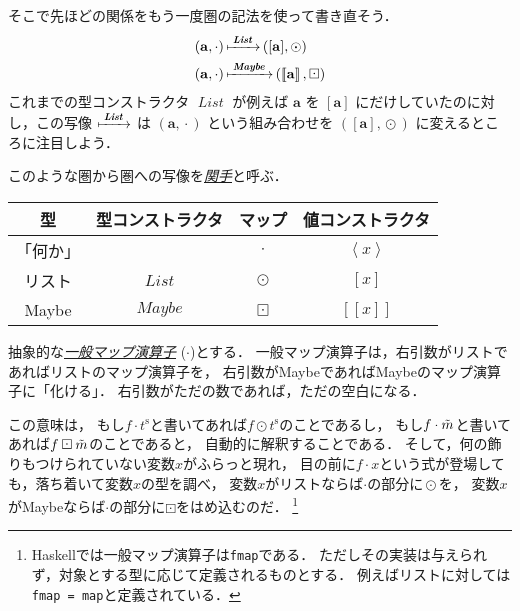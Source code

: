 \documentclass[a4paper,draft]{jsbook}
\def\[{\left[\!\left[}
\def\]{\right]\!\right]}
\newcommand{\programminglanguage}[1]{\textsf{#1}}
\newcommand{\haskell}{\programminglanguage{Haskell}}
\newcommand{\keyword}[1]{{\underline{\emph{#1}}}}
\newcommand{\code}[1]{\texttt{#1}}
\newcommand{\mType}[1]{\mathbf{#1}}
\newcommand{\mListType}[1]{[\mType{#1}]}
\newcommand{\mMaybeType}[1]{\[\mType{#1}\]}
\newcommand{\mFunctor}[1]{\textit{\textbf{#1}}}
\newcommand{\mTypeConstructor}[1]{\mathit{#1}} %
\newcommand{\mTupleOf}[1]{\left(#1\right)}
\newcommand{\mListVar}[1]{{#1}^\mathrm{s}}
\DeclareMathOperator{\mMap}{\cdot}
\DeclareMathOperator{\mMapList}{\odot}
\DeclareMathOperator{\mMapMaybe}{\boxdot}
\DeclareMathOperator{\mListTypeConstructor}{\mTypeConstructor{List}}
\DeclareMathOperator{\mListFunctor}{\mFunctor{List}}
\DeclareMathOperator{\mMaybeFunctor}{\mFunctor{Maybe}}
\DeclareMathOperator{\mListProjection}{\xmapsto{\;\mListFunctor\;}}
\DeclareMathOperator{\mMaybeProjection}{\xmapsto{\;\mMaybeFunctor\;}}
\newcommand{\mathTypeConstructor}[1]{\mathit{#1}} %
\newcommand{\mathMaybeVar}[1]{\Tilde{#1}}
\newcommand{\mathListWith}[1]{\left[#1\right]}
\newcommand{\mathMaybeWith}[1]{\[#1\]}
\newcommand{\mathPureWith}[1]{\left\langle#1\right\rangle}
\DeclareMathOperator{\mathList}{\mathTypeConstructor{List}}
\DeclareMathOperator{\mathMaybe}{\mathTypeConstructor{Maybe}}
\newcommand{\mathGeneralMap}{\mathbin{\cdot}}
\newcommand{\mathMaybeMap}{\mathbin{\boxdot}}
\begin{document}
そこで先ほどの関係をもう一度圏の記法を使って書き直そう．
\begin{align}
\mTupleOf{\mType{a},\mMap}
&\mListProjection\mTupleOf{\mListType{a},\mMapList}\\
\mTupleOf{\mType{a},\mMap}
&\mMaybeProjection\mTupleOf{\mMaybeType{a},\mMapMaybe}
\end{align}
これまでの型コンストラクタ $\mListTypeConstructor$ が例えば $\mType{a}$ を $\mListType{a}$ にだけしていたのに対し，この写像 $\mListProjection$ は $\mTupleOf{\mType{a},\mMap}$ という組み合わせを $\mTupleOf{\mListType{a},\mMapList}$ に変えるところに注目しよう．

このような圏から圏への写像を\keyword{関手}と呼ぶ．



\begin{table}
\begin{center}
\begin{tabular}{||c|c|c|c||}\hline
型&型コンストラクタ&マップ&値コンストラクタ\\\hline\hline
「何か」&&$\mathGeneralMap$&$\mathPureWith{x}$\\
リスト&$\mathList$&$\mMapList$&$\mathListWith{x}$\\
Maybe&$\mathMaybe$&$\mathMaybeMap$&$\mathMaybeWith{x}$\\\hline
\end{tabular}
\end{center}
\end{table}



抽象的な\keyword{一般マップ演算子} ($\mathGeneralMap$)とする．
一般マップ演算子は，右引数がリストであればリストのマップ演算子を，
右引数がMaybeであればMaybeのマップ演算子に「化ける」．
右引数がただの数であれば，ただの空白になる．

この意味は，
もし$f\mathGeneralMap\mListVar{t}$と書いてあれば$f\mMapList\mListVar{t}$のことであるし，
もし$f\mathGeneralMap\mathMaybeVar{m}$と書いてあれば$f\mathMaybeMap\mathMaybeVar{m}$のことであると，
自動的に解釈することである．
そして，何の飾りもつけられていない変数$x$がふらっと現れ，
目の前に$f\mathGeneralMap x$という式が登場しても，落ち着いて変数$x$の型を調べ，
変数$x$がリストならば$\mathGeneralMap$の部分に$\mMapList$を，
変数$x$がMaybeならば$\mathGeneralMap$の部分に$\mathMaybeMap$をはめ込むのだ．%
\footnote{\haskell では一般マップ演算子は\code{fmap}である．
ただしその実装は与えられず，対象とする型に応じて定義されるものとする．
例えばリストに対しては\code{fmap = map}と定義されている．}
\end{document}
